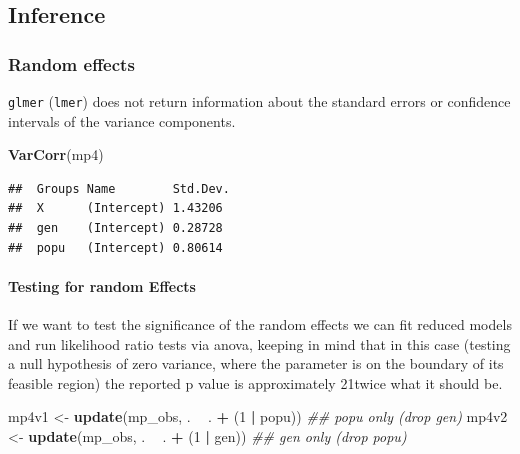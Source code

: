 \documentclass[
  12pt,
]{book}
\newenvironment{Shaded}{\begin{snugshade}}{\end{snugshade}}
\newcommand{\CommentTok}[1]{\textcolor[rgb]{0.56,0.35,0.01}{\textit{#1}}}
\newcommand{\DecValTok}[1]{\textcolor[rgb]{0.00,0.00,0.81}{#1}}
\newcommand{\KeywordTok}[1]{\textcolor[rgb]{0.13,0.29,0.53}{\textbf{#1}}}
\newcommand{\NormalTok}[1]{#1}
\newcommand{\OperatorTok}[1]{\textcolor[rgb]{0.81,0.36,0.00}{\textbf{#1}}}
\newcommand{\StringTok}[1]{\textcolor[rgb]{0.31,0.60,0.02}{#1}}
\begin{document}
\hypertarget{inference}{%
\subsection{Inference}\label{inference}}

\hypertarget{random-effects}{%
\subsubsection{Random effects}\label{random-effects}}

\texttt{glmer} (\texttt{lmer}) does not return information about the standard errors or confidence intervals of the variance components.

\begin{Shaded}
\begin{Highlighting}[]
\KeywordTok{VarCorr}\NormalTok{(mp4)}
\end{Highlighting}
\end{Shaded}

\begin{verbatim}
##  Groups Name        Std.Dev.
##  X      (Intercept) 1.43206 
##  gen    (Intercept) 0.28728 
##  popu   (Intercept) 0.80614
\end{verbatim}

\hypertarget{testing-for-random-effects}{%
\paragraph{Testing for random Effects}\label{testing-for-random-effects}}

If we want to test the significance of the random effects we can fit reduced models and run likelihood ratio tests via anova, keeping in mind that in this case (testing a null hypothesis of zero variance, where the parameter is on the boundary of its feasible region) the reported p value is approximately 21twice what it should be.

\begin{Shaded}
\begin{Highlighting}[]
\NormalTok{mp4v1 <-}\StringTok{ }\KeywordTok{update}\NormalTok{(mp_obs, . }\OperatorTok{~}\StringTok{ }\NormalTok{. }\OperatorTok{+}\StringTok{ }\NormalTok{(}\DecValTok{1} \OperatorTok{|}\StringTok{ }\NormalTok{popu)) }\CommentTok{## popu only (drop gen)}
\NormalTok{mp4v2 <-}\StringTok{ }\KeywordTok{update}\NormalTok{(mp_obs, . }\OperatorTok{~}\StringTok{ }\NormalTok{. }\OperatorTok{+}\StringTok{ }\NormalTok{(}\DecValTok{1} \OperatorTok{|}\StringTok{ }\NormalTok{gen)) }\CommentTok{## gen only (drop popu)}
\end{Highlighting}
\end{Shaded}
\end{document}
